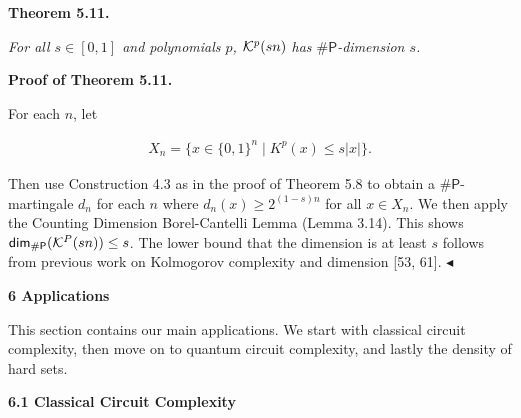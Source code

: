 \documentclass[10pt,a4paper]{article}
\begin{document}


\par\medskip\noindent\textbf{
\textbf{Theorem 5.11}\textbf{.}
}\par



\emph{For all $s\in[0,1]$ and polynomials $p$, ${\cal K}^{p}(sn)$ has ${\mathsf{\#}\mathsf{P}}$-dimension $s$.}\par







\par\medskip\noindent\textbf{Proof of Theorem 5.11.}\par




For each $n$, let\par


\[\begin{gathered}
X_{n}=\{x\in\{0,1\}^{n}\mid K^{p}(x)\leq s|x|\}.
\end{gathered}\]


Then use Construction 4.3 as in the proof of Theorem 5.8 to obtain a ${\mathsf{\#}\mathsf{P}}$-martingale $d_{n}$ for each $n$ where $d_{n}(x)\geq 2^{(1-s)n}$ for all $x\in X_{n}.$ We then apply the Counting Dimension Borel-Cantelli Lemma (Lemma 3.14).
This shows ${\mathsf{dim}}_{{\mathsf{\#}\mathsf{P}}}({\cal K}^{P}(sn))\leq s$. The lower bound that the dimension is at least $s$ follows from previous work on Kolmogorov complexity and dimension [53, 61].
$\blacktriangleleft$\par







\par\medskip\noindent\textbf{
6 Applications}\par




This section contains our main applications. We start with classical circuit complexity, then move on to quantum circuit complexity, and lastly the density of hard sets.\par




\par\medskip\noindent\textbf{
6.1 Classical Circuit Complexity}\par
\end{document}
